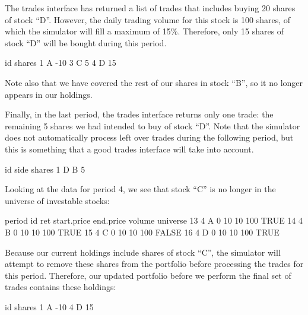 \documentclass{article}
\begin{document}
The trades interface has returned a list of trades that includes
buying 20 shares of stock ``D''.  However, the daily trading volume
for this stock is 100 shares, of which the simulator will fill a
maximum of 15\%.  Therefore, only 15 shares of stock ``D'' will be
bought during this period.

\begin{Schunk}
\begin{Soutput}
  id shares
1  A    -10
3  C      5
4  D     15
\end{Soutput}
\end{Schunk}

Note also that we have covered the rest of our shares in stock ``B'',
so it no longer appears in our holdings.

Finally, in the last period, the trades interface returns only one
trade: the remaining 5 shares we had intended to buy of stock ``D''.
Note that the simulator does not automatically process left over
trades during the following period, but this is something that a good
trades interface will take into account.

\begin{Schunk}
\begin{Soutput}
  id side shares
1  D    B      5
\end{Soutput}
\end{Schunk}

Looking at the data for period 4, we see that stock ``C'' is no longer
in the universe of investable stocks:

\begin{Schunk}
\begin{Soutput}
   period id ret start.price end.price volume universe
13      4  A   0          10        10    100     TRUE
14      4  B   0          10        10    100     TRUE
15      4  C   0          10        10    100    FALSE
16      4  D   0          10        10    100     TRUE
\end{Soutput}
\end{Schunk}

Because our current holdings include shares of stock ``C'', the
simulator will attempt to remove these shares from the portfolio
before processing the trades for this period.  Therefore, our updated
portfolio before we perform the final set of trades contains these
holdings:

\begin{Schunk}
\begin{Soutput}
  id shares
1  A    -10
4  D     15
\end{Soutput}
\end{Schunk}
\end{document}
